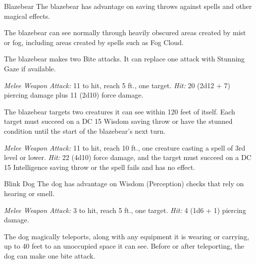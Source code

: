 \documentclass[10pt,a4paper,twoside,bg=print,twocolumn,openany,nodeprecatedcode]{dndbook}
\begin{document}
\begin{DndMonster}[float=t]{Blazebear}
\DndMonsterBasics[
armor-class = {14 (natural armor)},
hit-points = {\DndDice{18d10 + 90}},
speed = {30 ft.}
]
\DndMonsterAbilityScores[
 str = 24,
 dex = 17,
 con = 21,
 int = 3,
 wis = 13,
 cha = 16
]
\DndMonsterDetails[
saving-throws = {Str +11, Cha +7},
skills = {Perception +5},
senses = {darkvision 120 ft., passive perception 15},
challenge = 12,
]
The blazebear has advantage on saving throws against spells and other magical effects.

The blazebear can see normally through heavily obscured areas created by mist or fog, including areas created by spells such as Fog Cloud.

The blazebear makes two Bite attacks. It can replace one attack with Stunning Gaze if available.

\textsl{Melee Weapon Attack:} 11 to hit, reach 5 ft., one target. \textsl{Hit:} 20 (2d12 + 7) piercing damage plus 11 (2d10) force damage.

The blazebear targets two creatures it can see within 120 feet of itself. Each target must succeed on a DC 15 Wisdom saving throw or have the stunned condition until the start of the blazebear's next turn.

\textsl{Melee Weapon Attack:} 11 to hit, reach 10 ft., one creature casting a spell of 3rd level or lower. \textsl{Hit:} 22 (4d10) force damage, and the target must succeed on a DC 15 Intelligence saving throw or the spell fails and has no effect.

\end{DndMonster}



\begin{DndMonster}[float=t]{Blink Dog}
\DndMonsterBasics[
armor-class = {13},
hit-points = {\DndDice{4d8 + 4}},
speed = {40 ft.}
]
\DndMonsterAbilityScores[
 str = 12,
 dex = 17,
 con = 12,
 int = 10,
 wis = 13,
 cha = 11
]
\DndMonsterDetails[
skills = {Perception +3, Stealth +5},
languages = {Blink Dog, understands Sylvan but can't speak it},
challenge = 1/4,
]
The dog has advantage on Wisdom (Perception) checks that rely on hearing or smell.

\textsl{Melee Weapon Attack:} 3 to hit, reach 5 ft., one target. \textsl{Hit:} 4 (1d6 + 1) piercing damage.

The dog magically teleports, along with any equipment it is wearing or carrying, up to 40 feet to an unoccupied space it can see. Before or after teleporting, the dog can make one bite attack.

\end{DndMonster}
\end{document}

